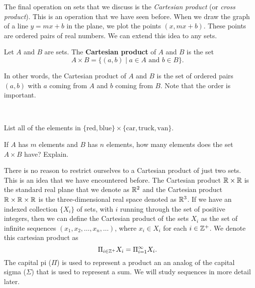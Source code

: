 
The final operation on sets that we discuss is the \emph{Cartesian product} (or \emph{cross product}). This is an operation that we have seen before. When we draw the graph of a line $y = mx+b$ in the plane, we plot the points $(x,mx+b)$. These points are ordered pairs of real numbers. We can extend this idea to any sets. 

\begin{definition} Let $A$ and $B$ are sets. The \textbf{Cartesian product} of $A$ and $B$ is the set 
\[A \times B = \{(a,b) \mid a \in A \text{ and } b \in B\}.\]
\end{definition}

In other words, the Cartesian product of $A$ and $B$ is the set of ordered pairs $(a,b)$ with $a$ coming from $A$ and $b$ coming from $B$. Note that the order is important. 

\begin{activity} ~
	\ba
	\item List all of the elements in $\{\text{red}, \text{blue}\} \times \{\text{car}, \text{truck}, \text{van}\}$. 
	
	\item If $A$ has $m$ elements and $B$ has $n$ elements, how many elements does the set $A \times B$ have? Explain.

	\ea
	
\end{activity}

\begin{comment}

\ActivitySolution

	\ba
	\item The elements are 
	\begin{center} (red,car), (red,truck), (red,van), (blue,car), (blue,truck), (blue,van).\end{center}
	
	\item Any element in $A \times B$ pairs an element of $A$ with an element of $B$. We can choose $n$ elements from $A$ and $m$ from $B$, so the total number of pairings is $nm$. 

	\ea
	

\end{comment}

There is no reason to restrict ourselves to a Cartesian product of just two sets. This is an idea that we have encountered before. The Cartesian product $\mathbb{R} \times \mathbb{R}$ is the standard real plane that we denote as $\mathbb{R}^2$ and the Cartesian product $\mathbb{R} \times \mathbb{R} \times \mathbb{R}$ is the three-dimensional real space denoted as $\mathbb{R}^3$. If we have an indexed collection $\{X_{i}\}$ of sets, with $i$ running through the set of positive integers, then we can define the Cartesian product of the sets $X_{i}$ as the set of infinite sequences $(x_1, x_2, \ldots, x_n, \ldots)$, where $x_i \in X_i$ for each $i \in \mathbb{Z}^+$. We denote this cartesian product as 
\[\Pi_{i \in \mathbb{Z}^+} X_i = \Pi_{i=1}^{\infty} X_i. \]
The capital pi ($\Pi$) is used to represent a product an an analog of the capital sigma ($\Sigma$) that is used to represent a sum. We will study sequences in more detail later. 


